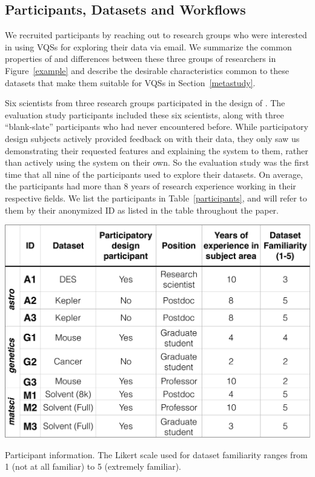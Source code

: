 \subsection{Participants, Datasets and Workflows}
We recruited participants by reaching out to research groups who were interested in using VQSs for exploring their data via email. %
 We summarize the common properties of and differences between these three groups of researchers in Figure~\ref{example} and describe the desirable characteristics common to these datasets that make them suitable for VQSs in Section~\ref{metastudy}.
\par Six scientists from three research groups participated in the design of \zv. The evaluation study participants included these six scientists, along with three ``blank-slate'' participants who had never encountered \zv before. While participatory design subjects actively provided feedback on \zv with their data, they only saw us demonstrating their requested features and explaining the system to them, rather than actively using the system on their own. So the evaluation study was the first time that all nine of the participants used \zv to explore their datasets. On average, the participants had more than 8 years of research experience working in their respective fields. We list the participants in Table~\ref{participants}, and will refer to them by their anonymized ID as listed in the table throughout the paper. 
\begin{table}[h]
\centering
\vspace{-10pt}
\includegraphics[width=\linewidth]{figures/participants.pdf}
\caption{Participant information. The Likert scale used for dataset familiarity ranges from 1 (not at all familiar) to 5 (extremely familiar).}
\label{participants}
\vspace{-10pt}
\end{table}

